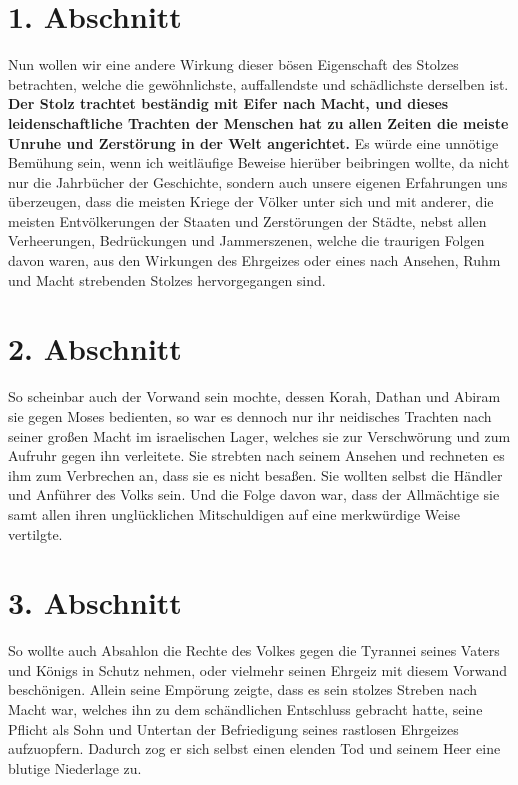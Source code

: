 \newpage

\section{1. Abschnitt} \label{kap8_ab1}

Nun wollen wir eine andere Wirkung dieser bösen Eigenschaft des Stolzes
betrachten, welche die gewöhnlichste, auffallendste und schädlichste derselben
ist.
\label{ref:08_01_stolz} \textbf{
    Der Stolz trachtet beständig mit Eifer nach Macht, und
dieses leidenschaftliche Trachten der Menschen hat zu allen Zeiten die meiste
Unruhe und Zerstörung in der Welt angerichtet.
}Es würde eine unnötige Bemühung sein,
wenn ich weitläufige Beweise hierüber beibringen wollte, da nicht nur die
Jahrbücher der Geschichte, sondern auch unsere eigenen Erfahrungen uns
überzeugen, dass die meisten Kriege der Völker unter sich und mit
anderer, die
meisten Entvölkerungen der Staaten und Zerstörungen der Städte, nebst allen
Verheerungen, Bedrückungen und Jammerszenen,
welche die traurigen Folgen davon waren, aus den Wirkungen des
Ehrgeizes oder eines nach Ansehen, Ruhm und Macht strebenden Stolzes
hervorgegangen sind.

\section{2. Abschnitt} \label{kap8_ab2}

So scheinbar auch der Vorwand sein mochte, dessen Korah,
Dathan und Abiram sie
gegen Moses bedienten, so war es dennoch nur ihr
neidisches Trachten nach seiner
großen Macht im israelischen Lager, welches sie zur Verschwörung und zum
Aufruhr gegen ihn verleitete. Sie strebten nach seinem Ansehen und rechneten es
ihm zum Verbrechen an, dass sie es nicht besaßen. Sie wollten selbst die Händler
und Anführer des Volks sein. Und die Folge davon war, dass der Allmächtige sie
samt allen ihren unglücklichen Mitschuldigen auf eine merkwürdige Weise
vertilgte.

\section{3. Abschnitt} \label{kap8_ab3}

So wollte auch Absahlon die Rechte des Volkes gegen
die Tyrannei seines Vaters
und Königs in Schutz nehmen, oder vielmehr seinen Ehrgeiz mit diesem Vorwand
beschönigen. Allein seine Empörung zeigte, dass es sein stolzes Streben nach
Macht war, welches ihn zu dem schändlichen Entschluss gebracht hatte, seine
Pflicht als Sohn und Untertan der Befriedigung seines rastlosen Ehrgeizes
aufzuopfern. Dadurch zog er sich selbst einen elenden Tod und seinem Heer eine
blutige Niederlage zu.

